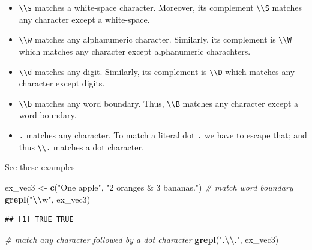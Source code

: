 \documentclass[
]{book}
\newenvironment{Shaded}{\begin{snugshade}}{\end{snugshade}}
\newcommand{\CommentTok}[1]{\textcolor[rgb]{0.56,0.35,0.01}{\textit{#1}}}
\newcommand{\FunctionTok}[1]{\textcolor[rgb]{0.13,0.29,0.53}{\textbf{#1}}}
\newcommand{\NormalTok}[1]{#1}
\newcommand{\OtherTok}[1]{\textcolor[rgb]{0.56,0.35,0.01}{#1}}
\newcommand{\SpecialCharTok}[1]{\textcolor[rgb]{0.81,0.36,0.00}{\textbf{#1}}}
\newcommand{\StringTok}[1]{\textcolor[rgb]{0.31,0.60,0.02}{#1}}
\providecommand{\tightlist}{%
  \setlength{\itemsep}{0pt}\setlength{\parskip}{0pt}}
\begin{document}
\begin{itemize}
\tightlist
\item
  \texttt{\textbackslash{}\textbackslash{}s} matches a white-space character. Moreover, its complement \texttt{\textbackslash{}\textbackslash{}S} matches any character except a white-space.
\item
  \texttt{\textbackslash{}\textbackslash{}w} matches any alphanumeric character. Similarly, its complement is \texttt{\textbackslash{}\textbackslash{}W} which matches any character except alphanumeric charachters.
\item
  \texttt{\textbackslash{}\textbackslash{}d} matches any digit. Similarly, its complement is \texttt{\textbackslash{}\textbackslash{}D} which matches any character except digits.
\item
  \texttt{\textbackslash{}\textbackslash{}b} matches any word boundary. Thus, \texttt{\textbackslash{}\textbackslash{}B} matches any character except a word boundary.
\item
  \texttt{.} matches any character. To match a literal dot \texttt{.} we have to escape that; and thus \texttt{\textbackslash{}\textbackslash{}.} matches a dot character.
\end{itemize}

See these examples-

\begin{Shaded}
\begin{Highlighting}[]
\NormalTok{ex\_vec3 }\OtherTok{\textless{}{-}} \FunctionTok{c}\NormalTok{(}\StringTok{"One apple"}\NormalTok{, }\StringTok{"2 oranges \& 3 bananas."}\NormalTok{)}
\CommentTok{\# match word boundary}
\FunctionTok{grepl}\NormalTok{(}\StringTok{"}\SpecialCharTok{\textbackslash{}\textbackslash{}}\StringTok{w"}\NormalTok{, ex\_vec3)}
\end{Highlighting}
\end{Shaded}

\begin{verbatim}
## [1] TRUE TRUE
\end{verbatim}

\begin{Shaded}
\begin{Highlighting}[]
\CommentTok{\# match any character followed by a dot character}
\FunctionTok{grepl}\NormalTok{(}\StringTok{".}\SpecialCharTok{\textbackslash{}\textbackslash{}}\StringTok{."}\NormalTok{, ex\_vec3)}
\end{Highlighting}
\end{Shaded}
\end{document}
